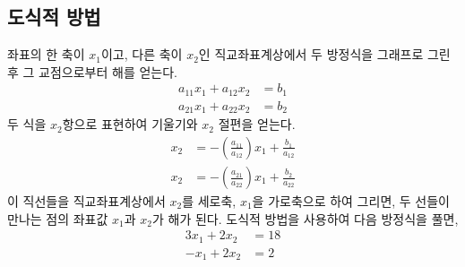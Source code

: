 \subsection{도식적 방법}
좌표의 한 축이 $x_{1}$이고, 다른 축이 $x_{2}$인 직교좌표계상에서 두 방정식을 그래프로 그린 후 그 교점으로부터 해를 얻는다.
\begin{align*}
a_{11}x_{1}+a_{12}x_{2}&=b_{1}\\
a_{21}x_{1}+a_{22}x_{2}&=b_{2}
\end{align*}
두 식을 $x_{2}$항으로 표현하여 기울기와 $x_{2}$ 절편을 얻는다.
\begin{align*}
x_{2}&=-\left(\frac{a_{11}}{a_{12}}\right)x_{1}+\frac{b_{1}}{a_{12}}\\
x_{2}&=-\left(\frac{a_{21}}{a_{22}}\right)x_{1}+\frac{b_{2}}{a_{22}}
\end{align*}
이 직선들을 직교좌표계상에서 $x_{2}$를 세로축, $x_{1}$을 가로축으로 하여 그리면, 두 선들이 만나는 점의 좌표값 $x_{1}$과 $x_{2}$가 해가 된다.
도식적 방법을 사용하여 다음 방정식을 풀면,
\begin{align*}
3x_{1}+2x_{2}&=18\\
-x_{1}+2x_{2}&=2
\end{align*}

